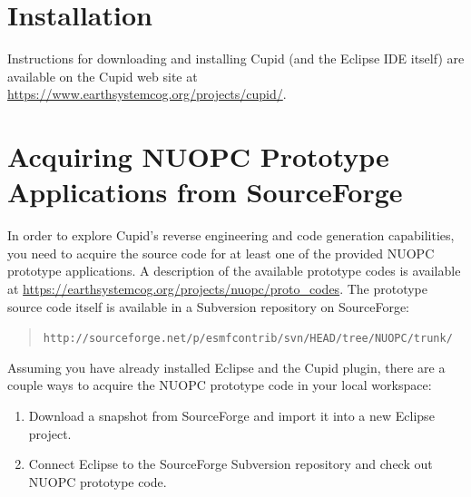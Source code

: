 \documentclass[oneside,11pt]{memoir}
\begin{document}


\section{Installation}

Instructions for downloading and installing Cupid (and the Eclipse IDE itself) are available on the Cupid web site at \href{https://www.earthsystemcog.org/projects/cupid/}{https://www.earthsystemcog.org/projects/cupid/}.


\section{Acquiring NUOPC Prototype Applications from SourceForge}

In order to explore Cupid's reverse engineering and code generation capabilities, you need to acquire the source code for at least one of the provided NUOPC prototype applications. A description of the available prototype codes is available at \href{https://earthsystemcog.org/projects/nuopc/proto\_codes}{https://earthsystemcog.org/projects/nuopc/proto\_codes}. The prototype source code itself is available in a Subversion repository on SourceForge:

\begin{quote}
\texttt{http://sourceforge.net/p/esmfcontrib/svn/HEAD/tree/NUOPC/trunk/}
\end{quote}

Assuming you have already installed Eclipse and the Cupid plugin, there are a couple ways to acquire the NUOPC prototype code in your local workspace:
\begin{enumerate}
\item Download a snapshot from SourceForge and import it into a new Eclipse project.
\item Connect Eclipse to the SourceForge Subversion repository and check out NUOPC prototype code.
\end{enumerate}
\end{document}
